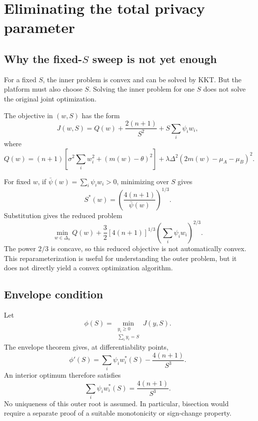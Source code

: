 \documentclass[11pt,a4paper]{article}
\newcommand{\1}{\mathbf{1}}
\begin{document}
\section{Eliminating the total privacy parameter}

\subsection{Why the fixed-\texorpdfstring{$S$}{S} sweep is not yet enough}

For a fixed \(S\), the inner problem is convex and can be solved by KKT.
But the platform must also choose \(S\). Solving the inner problem for
one \(S\) does not solve the original joint optimization.

The objective in \((w,S)\) has the form
\begin{equation}
  J(w,S)=Q(w)+\frac{2(n+1)}{S^2}
  +S\sum_i\psi_iw_i,
  \label{eq:Q-form}
\end{equation}
where
\begin{equation}
  Q(w)=(n+1)\left[
    \sigma^2\sum_iw_i^2+(m(w)-\theta)^2
  \right]
  +\lambda\Delta^2(2m(w)-\mu_A-\mu_B)^2.
\end{equation}

For fixed \(w\), if \(\bar\psi(w)=\sum_i\psi_iw_i>0\), minimizing over
\(S\) gives
\begin{equation}
  S^*(w)=
  \left(\frac{4(n+1)}{\bar\psi(w)}\right)^{1/3}.
  \label{eq:S-fixed-w}
\end{equation}
Substitution gives the reduced problem
\begin{equation}
  \min_{w\in\Delta_n}
  Q(w)+\frac32[4(n+1)]^{1/3}
  \left(\sum_i\psi_iw_i\right)^{2/3}.
  \label{eq:reduced-w}
\end{equation}
The power \(2/3\) is concave, so this reduced objective is not
automatically convex. This reparameterization is useful for understanding
the outer problem, but it does not directly yield a convex optimization
algorithm.

\subsection{Envelope condition}

Let
\[
\phi(S)=\min_{\substack{y_i\geq0\\\sum_i y_i=S}}J(y,S).
\]
The envelope theorem gives, at differentiability points,
\begin{equation}
  \phi'(S)
  =
  \sum_i\psi_iw_i^*(S)-\frac{4(n+1)}{S^3}.
  \label{eq:envelope}
\end{equation}
An interior optimum therefore satisfies
\begin{equation}
  \boxed{
  \sum_i\psi_iw_i^*(S)
  =\frac{4(n+1)}{S^3}.
  }
  \label{eq:outer-stationarity}
\end{equation}
No uniqueness of this outer root is assumed. In particular, bisection
would require a separate proof of a suitable monotonicity or sign-change
property.
\end{document}
